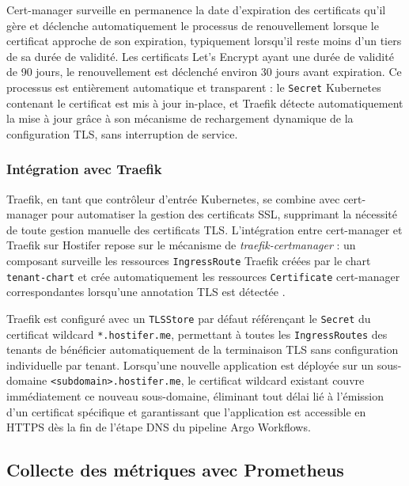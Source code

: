 Cert-manager surveille en permanence la date d'expiration des certificats qu'il gère et déclenche automatiquement le processus de renouvellement lorsque le certificat approche de son expiration, typiquement lorsqu'il reste moins d'un tiers de sa durée de validité.  Les certificats Let's Encrypt ayant une durée de validité de 90 jours, le renouvellement est déclenché environ 30 jours avant expiration. Ce processus est entièrement automatique et transparent : le \texttt{Secret} Kubernetes contenant le certificat est mis à jour in-place, et Traefik détecte automatiquement la mise à jour grâce à son mécanisme de rechargement dynamique de la configuration TLS, sans interruption de service.

\subsubsection*{Intégration avec Traefik}

Traefik, en tant que contrôleur d'entrée Kubernetes, se combine avec cert-manager pour automatiser la gestion des certificats SSL, supprimant la nécessité de toute gestion manuelle des certificats TLS.  L'intégration entre cert-manager et Traefik sur Hostifer repose sur le mécanisme de \textit{traefik-certmanager} : un composant surveille les ressources \texttt{IngressRoute} Traefik créées par le chart \texttt{tenant-chart} et crée automatiquement les ressources \texttt{Certificate} cert-manager correspondantes lorsqu'une annotation TLS est détectée \cite{traefik-certmanager}.

Traefik est configuré avec un \texttt{TLSStore} par défaut référençant le \texttt{Secret} du certificat wildcard \texttt{*.hostifer.me}, permettant à toutes les \texttt{IngressRoutes} des tenants de bénéficier automatiquement de la terminaison TLS sans configuration individuelle par tenant. Lorsqu'une nouvelle application est déployée sur un sous-domaine \texttt{<subdomain>.hostifer.me}, le certificat wildcard existant couvre immédiatement ce nouveau sous-domaine, éliminant tout délai lié à l'émission d'un certificat spécifique et garantissant que l'application est accessible en HTTPS dès la fin de l'étape DNS du pipeline Argo Workflows.


\subsection{Collecte des métriques avec Prometheus}

